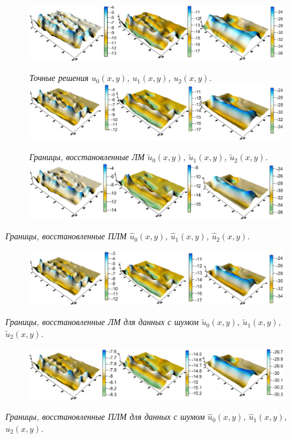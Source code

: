\documentclass[10pt,pdf, mathserif, hyperref={unicode}]{beamer}
\begin{document}
\begin{frame}
	\begin{figure}
		\centering
		\includegraphics[height=0.2\textheight]{exact_hor}

		\centering\textit{Точные решения $u_0(x,y)$, $u_1(x,y)$, $u_2(x,y)$.}
		\includegraphics[height=0.2\textheight]{levmar}

		\centering\textit{Границы, восстановленные ЛМ $\tilde{u}_0(x,y)$, $\tilde{u}_1(x,y)$, $\tilde{u}_2(x,y)$.}
		\centering
		\includegraphics[height=0.2\textheight]{clm}
	\end{figure}
	\centering\textit{Границы, восстановленные ПЛМ $\hat{u}_0(x,y)$, $\hat{u}_1(x,y)$, $\hat{u}_2(x,y)$.}

\end{frame}
\begin{frame}
	\begin{figure}
		\centering
		\includegraphics[height=0.2\textheight]{lm_noise}
	\end{figure}
	\centering\textit{Границы, восстановленные ЛМ для данных с шумом $\tilde{u}_0(x,y)$, $\tilde{u}_1(x,y)$, $\tilde{u}_2(x,y)$.}
	\begin{figure}
		\centering
		\includegraphics[height=0.2\textheight]{clm_noise}
	\end{figure}
	\centering\textit{Границы, восстановленные ПЛМ для данных с шумом $\hat{u}_0(x,y)$, $\hat{u}_1(x,y)$, $\hat{u}_2(x,y)$.}
\end{frame}
\end{document}
